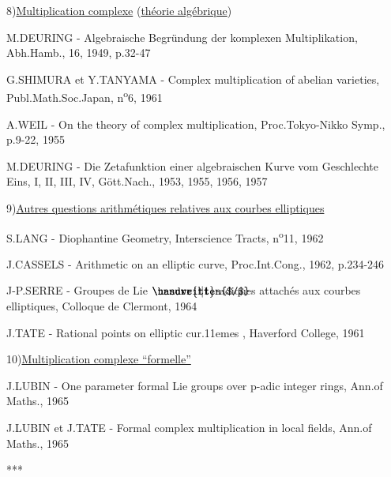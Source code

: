 \clearpage
{}
\reversemarginpar
{}
\normalmarginpar
{}

8)\quad \uline{Multiplication complexe} (\uline{théorie algébrique})

M.DEURING - Algebraische Begründung der komplexen Multiplikation, Abh.Hamb., 16, 1949, p.32-47

\reversemarginpar
{}
G.SHIMURA et Y.TANYAMA - Complex multiplication of abelian varieties, Publ.Math.Soc.Japan, n\textsuperscript{o}6, 1961

A.WEIL - On the theory of complex multiplication, Proc.Tokyo-Nikko Symp., p.9-22, 1955

M.DEURING - Die Zetafunktion einer algebraischen Kurve vom Geschlechte Eins, I, II, III, IV, Gött.Nach., 1953, 1955, 1956, 1957

9)\quad \uline{Autres questions arithmétiques relatives aux courbes elliptiques}

S.LANG - Diophantine Geometry, Interscience Tracts, n\textsuperscript{o}11, 1962

J.CASSELS - Arithmetic on an elliptic curve, Proc.Int.Cong., 1962, p.234-246

J-P.SERRE - Groupes de Lie $\mathord{\rlap{\handwritten{$/$}}\unsure{\mathrm{l}|1}}$-adiques attachés aux courbes elliptiques, Colloque de Clermont, 1964

J.TATE - Rational points on elliptic cur\kern.11emes , Haverford College, 1961

10)\quad \uline{Multiplication complexe ``formelle''}

J.LUBIN - One parameter formal Lie groups over $\mathrm{p}$-adic integer rings, Ann.of Maths., 1965

J.LUBIN et J.TATE - Formal complex multiplication in local fields, Ann.of Maths., 1965

\begin{center}
***
\end{center}
\normalmarginpar
